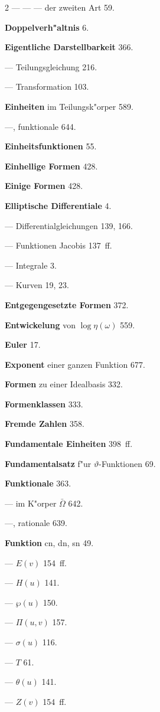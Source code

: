 \documentclass[12pt,a4paper]{article}
\begin{document}
\begin{multicols}{2}
--- --- --- der zweiten Art 59.

\textbf{Doppelverh"altnis} 6.

\bigskip

\textbf{Eigentliche Darstellbarkeit} 366.

--- Teilungsgleichung 216.

--- Transformation 103.

\textbf{Einheiten} im Teilungsk"orper 589.

---, funktionale 644.

\textbf{Einheitsfunktionen} 55.

\textbf{Einhellige Formen} 428.

\textbf{Einige Formen} 428.

\textbf{Elliptische Differentiale} 4.

--- Differentialgleichungen 139, 166.

--- Funktionen Jacobis 137~ff.

--- Integrale 3.

--- Kurven 19, 23.

\textbf{Entgegengesetzte Formen} 372.

\textbf{Entwickelung} von $\log\eta(\omega)$ 559.

\textbf{Euler} 17.

\textbf{Exponent} einer ganzen Funktion 677.

\bigskip

\textbf{Formen} zu einer Idealbasis 332.

\textbf{Formenklassen} 333.

\textbf{Fremde Zahlen} 358.

\textbf{Fundamentale Einheiten} 398~ff.

\textbf{Fundamentalsatz} f"ur $\vartheta$-Funktionen 69.

\textbf{Funktionale} 363.

--- im K"orper $\bar{\Omega}$ 642.

---, rationale 639.

\textbf{Funktion} cn, dn, sn 49.

--- $E(v)$ 154~ff.

--- $H(u)$ 141.

--- $\wp(u)$ 150.

--- $\Pi(u,v)$ 157.

--- $\sigma(u)$ 116.

--- $T$ 61.

--- $\theta(u)$ 141.

--- $Z(v)$ 154~ff.


\end{multicols}
\end{document}
